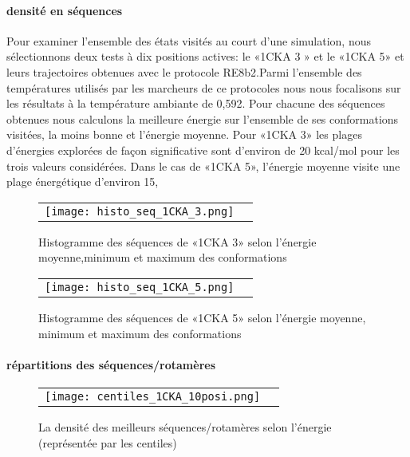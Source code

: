    \paragraph{densité en séquences}
Pour examiner l'ensemble des états visités au court d'une simulation, nous sélectionnons deux tests à dix positions actives: le «1CKA 3 » et le «1CKA 5» et leurs trajectoires obtenues avec le protocole RE8b2.Parmi l'ensemble des températures utilisés par les marcheurs de ce protocoles nous nous focalisons sur les résultats à la température ambiante de 0,592. 
Pour chacune des séquences obtenues nous calculons la meilleure énergie sur l'ensemble de ses conformations visitées, la moins bonne et l'énergie moyenne. Pour «1CKA 3» les plages d'énergies explorées de façon significative sont d'environ de 20 kcal/mol pour les trois valeurs considérées. Dans le cas de «1CKA 5», l'énergie moyenne visite une plage énergétique d'environ 15,  



    \begin{figure}[h]
      \centering
      \begin{tabular}{cc} 
        \texttt{[image: histo\_seq\_1CKA\_3.png]} &
      \end{tabular}
      
      \caption{Histogramme des séquences de «1CKA 3» selon l'énergie moyenne,minimum et maximum des conformations}
\label{graph:densité_en_séquences1}
    \end{figure}


    \begin{figure}[h]
      \centering
      \begin{tabular}{cc} 
        \texttt{[image: histo\_seq\_1CKA\_5.png]} &
      \end{tabular}
      
      \caption{Histogramme des séquences de «1CKA 5» selon l'énergie moyenne, minimum et maximum des conformations}
\label{graph:densité_en_séquences2}
    \end{figure}

    \clearpage
   \paragraph{répartitions des séquences/rotamères}

    \begin{figure}[h]
      \centering
      \begin{tabular}{cc} 
        \texttt{[image: centiles\_1CKA\_10posi.png]} &
      \end{tabular}
      
      \caption{La densité des meilleurs séquences/rotamères selon l'énergie (représentée par les centiles)}
\label{graph:densité_en_séquences1}
    \end{figure}


